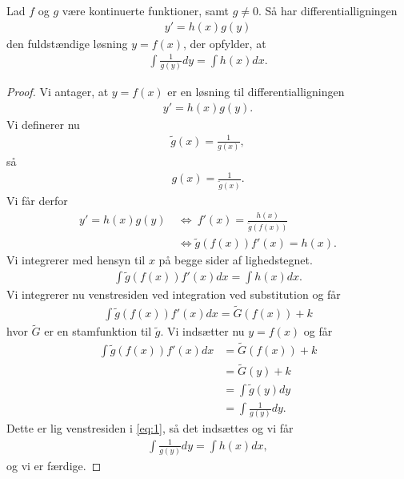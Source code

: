 \begin{setn}
	Lad $f$ og $g$ være kontinuerte funktioner, samt $g \neq 0$. 
	Så har differentialligningen
	\begin{align*}
		y' = h(x)g(y)
	\end{align*}
	den fuldstændige løsning $y = f(x)$, der opfylder, at 
	\begin{align*}
		\int \frac{1}{g(y)}dy = \int h(x) dx.
	\end{align*}
\end{setn}
\begin{proof}
	Vi antager, at $y = f(x)$ er en løsning til differentialligningen
	\begin{align*}
		y' = h(x)g(y).
	\end{align*}
	Vi definerer nu 
	\begin{align*}
		\tilde{g}(x) = \frac{1}{g(x)},
	\end{align*}
	så 
	\begin{align*}
		g(x) = \frac{1}{\tilde{g}(x)}.
	\end{align*}
	Vi får derfor
	\begin{align*}
		y' = h(x)g(y) \ &\Leftrightarrow \ f'(x) = \frac{h(x)}{\tilde{g}(f(x))}\\
					&\Leftrightarrow \tilde{g}(f(x))f'(x) = h(x). 
	\end{align*}
	Vi integrerer med hensyn til $x$ på begge sider af lighedstegnet.
	\begin{align}\label{eq:1}
		\int\tilde{g}(f(x))f'(x) dx = \int h(x) dx.
	\end{align}
	Vi integrerer nu venstresiden ved integration ved substitution og får
	\begin{align*}
		\int\tilde{g}(f(x))f'(x) dx = \tilde{G}(f(x)) +k
	\end{align*}
	hvor $\tilde{G}$ er en stamfunktion til $\tilde{g}$. Vi indsætter nu $y =f(x)$ og får
	\begin{align*}
		\int\tilde{g}(f(x))f'(x) dx &= \tilde{G}(f(x)) +k \\
		 &= \tilde{G}(y) + k \\
		&= \int \tilde{g}(y) dy \\
		&= \int \frac{1}{g(y)}dy.
	\end{align*}
	Dette er lig venstresiden i \eqref{eq:1}, så det indsættes og vi får
	\begin{align*}
		\int \frac{1}{g(y)}dy = \int h(x) dx,
	\end{align*}
	og vi er færdige.
\end{proof}


